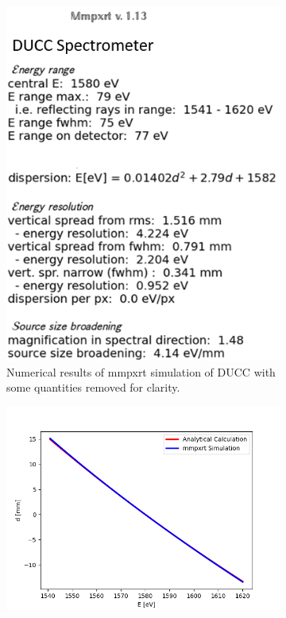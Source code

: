 \begin{figure} [H]
	\begin{subfigure}[t]{0.37\textwidth}
	\centering
		\includegraphics[width=\textwidth]{Diagrams/DUCCmmpxrtData.PNG}
		\caption{Numerical results of mmpxrt 
		simulation of DUCC with some 
		quantities removed for clarity.}
		\label{mmpxrtDUCCData}
	\end{subfigure}%
	\hfill
	\begin{subfigure}[t]{0.68\textwidth}
	\centering
		\includegraphics[width=\textwidth]{Diagrams/DispersionComparisonDUCK.png}

\end{subfigure}
\end{figure}
